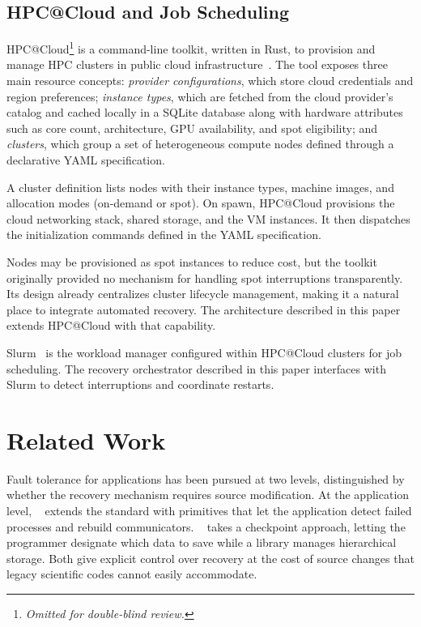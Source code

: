 \documentclass[conference]{IEEEtran}
\begin{document}
\subsection{HPC@Cloud and Job Scheduling}

HPC@Cloud\footnote{\textit{Omitted for double-blind review.}} is a command-line toolkit,
written in Rust, to provision and manage HPC clusters in public cloud
infrastructure~\cite{munhoz2024hpccloud-BLIND}.
%
The tool exposes
three main resource concepts: \emph{provider configurations}, which store cloud
credentials and region preferences; \emph{instance types}, which are fetched from
the cloud provider's catalog and cached locally in a SQLite database along with
hardware attributes such as core count, architecture, GPU availability, and spot
eligibility; and \emph{clusters}, which group a set of heterogeneous compute
nodes defined through a declarative YAML specification.

A cluster definition lists nodes with their instance types, machine images, and
allocation modes (on-demand or spot). On spawn, HPC@Cloud provisions the cloud
networking stack, shared storage, and the VM instances. It then dispatches the
initialization commands defined in the YAML specification.

Nodes may be provisioned as spot instances to reduce cost, but the toolkit originally
provided no mechanism for handling spot interruptions transparently.
Its design already centralizes cluster lifecycle management, making it a natural place to
integrate automated recovery. The architecture described in this paper extends HPC@Cloud with that capability.

Slurm~\cite{jette2003slurm} is the workload manager configured within HPC@Cloud clusters
for job scheduling. The recovery orchestrator described in this paper interfaces with Slurm to detect
interruptions and coordinate restarts.


\section{Related Work}
\label{sec:related}

Fault tolerance for \MPI applications has been pursued at two levels, distinguished by
whether the recovery mechanism requires source modification.
At the application level, \ULFM~\cite{bland2013ulfm} extends the \MPI standard with
primitives that let the application detect failed processes and rebuild communicators.
\SCR~\cite{moody2010scr} takes a checkpoint approach, letting the programmer designate
which data to save while a library manages hierarchical storage.
Both give explicit control over recovery at the cost of source changes that legacy
scientific codes cannot easily accommodate.
\end{document}
